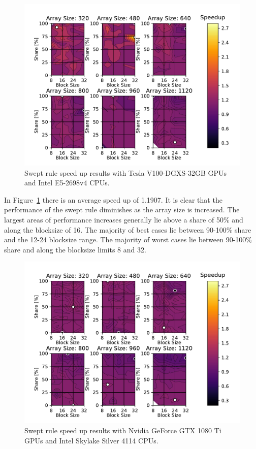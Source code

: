 \documentclass[review]{elsarticle}
\def\oldCPU{s}
\def\oldGPU{s}
\def\newCPU{s}
\def\newGPU{s}
\def\oldCPU{Intel Skylake Silver 4114} %
\def\oldGPU{Nvidia GeForce GTX 1080 Ti}
\def\newCPU{Intel E5-2698v4} %
\def\newGPU{Tesla V100-DGXS-32GB}
\begin{document}
\begin{figure}[htb!]
    \centering
    \includegraphics[scale=0.7]{figs/speedUpheatNew.pdf}
    \caption{Swept rule speed up results with \newGPU{} GPUs and \newCPU{} CPUs.}
    \label{fig:newSpeedupHeat}
\end{figure}

In Figure~\ref{fig:newSpeedupHeat} there is an average speed up of 1.1907. It is clear that the performance of the swept rule diminishes as the array size is increased. The largest areas of performance increases generally lie above a share of 50\% and along the blocksize of 16. The majority of best cases lie between 90-100\% share and the 12-24 blocksize range. The majority of worst cases lie between 90-100\% share and along the blocksize limits 8 and 32.

\begin{figure}[htb!]
    \centering
    \includegraphics[scale=0.7]{figs/speedUpheatOld.pdf}
    \caption{Swept rule speed up results with \oldGPU{} GPUs and \oldCPU{} CPUs.}
    \label{fig:oldSpeedupHeat}
\end{figure}
\end{document}

